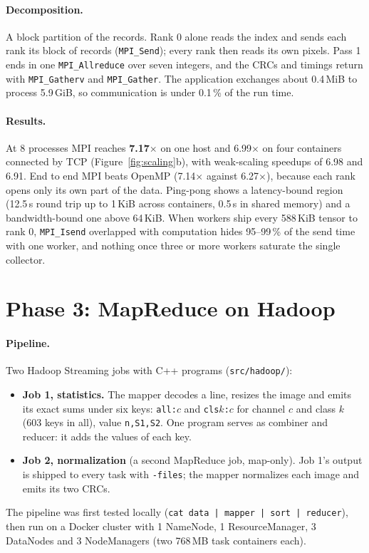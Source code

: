 \documentclass{zc-ust-hw}
\begin{document}
\paragraph{Decomposition.} A block partition of the records. Rank 0 alone reads the index and
sends each rank its block of records (\texttt{MPI\_Send}); every rank then reads its own pixels.
Pass 1 ends in one \texttt{MPI\_Allreduce} over seven integers, and the CRCs and timings return
with \texttt{MPI\_Gatherv} and \texttt{MPI\_Gather}. The application exchanges about 0.4\,MiB to
process 5.9\,GiB, so communication is under 0.1\,\% of the run time.

\paragraph{Results.} At 8 processes MPI reaches \textbf{7.17$\times$} on one host and
6.99$\times$ on four containers connected by TCP (Figure~\ref{fig:scaling}b), with weak-scaling
speedups of 6.98 and 6.91. End to end MPI beats OpenMP (7.14$\times$ against 6.27$\times$),
because each rank opens only its own part of the data. Ping-pong shows a latency-bound region
(12.5\,\textmu s round trip up to 1\,KiB across containers, 0.5\,\textmu s in shared memory) and
a bandwidth-bound one above 64\,KiB. When workers ship every 588\,KiB tensor to rank 0,
\texttt{MPI\_Isend} overlapped with computation hides 95--99\,\% of the send time with one
worker, and nothing once three or more workers saturate the single collector.

\section{Phase 3: MapReduce on Hadoop}

\paragraph{Pipeline.} Two Hadoop Streaming jobs with C++ programs (\texttt{src/hadoop/}):
\begin{itemize}
  \item \textbf{Job 1, statistics.} The mapper decodes a line, resizes the image and emits its
    exact sums under six keys: \texttt{all:}$c$ and \texttt{cls}$k$\texttt{:}$c$ for channel $c$
    and class $k$ (603 keys in all), value \texttt{n,S1,S2}. One program serves as combiner and
    reducer: it adds the values of each key.
  \item \textbf{Job 2, normalization} (a second MapReduce job, map-only). Job 1's output is
    shipped to every task with \texttt{-files}; the mapper normalizes each image and emits its
    two CRCs.
\end{itemize}
The pipeline was first tested locally (\texttt{cat data | mapper | sort | reducer}), then run on
a Docker cluster with 1 NameNode, 1 ResourceManager, 3 DataNodes and 3 NodeManagers (two 768\,MB
task containers each).
\end{document}
